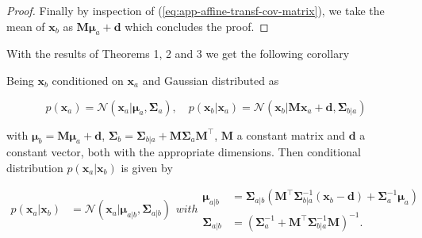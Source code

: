 \begin{appendices}
\begin{proof}
    Finally by inspection of (\ref{eq:app-affine-transf-cov-matrix}), we take the mean of $\mathbf{x}_b$ as $\mathbf{M} \boldsymbol{\mu}_{a}+\mathbf{d}$ which concludes the proof.
  \end{proof}

  With the results of Theorems 1, 2 and 3 we get the following corollary

  \begin{corollary}
    \label{cor:aff-marg-cond-gaussian}

    Being $\mathbf{x}_b$ conditioned on $\mathbf{x}_a$ and Gaussian distributed as

    \begin{equation}
      p\left(\mathbf{x}_{a}\right)=\mathcal{N}\left(\mathbf{x}_{a} | \boldsymbol{\mu}_{a}, \boldsymbol{\Sigma}_{a}\right), \quad p\left(\mathbf{x}_{b} | \mathbf{x}_{a}\right)=\mathcal{N}\left(\mathbf{x}_{b} | \mathbf{M} \mathbf{x}_{a}+\mathbf{d}, \boldsymbol{\Sigma}_{b | a}\right)
    \end{equation}

    with $\boldsymbol{\mu}_{b} =\mathbf{M} \boldsymbol{\mu}_{a}+\mathbf{d}$, $\boldsymbol{\Sigma}_{b} =\boldsymbol{\Sigma}_{b | a}+\mathbf{M} \boldsymbol{\Sigma}_{a} \mathbf{M}^\top$, $\mathbf{M}$ a constant matrix and $\mathbf{d}$ a constant vector, both with the appropriate dimensions. Then conditional distribution $p(\mathbf{x}_a|\mathbf{x}_b)$ is given by

    \begin{subequations}
    
    \begin{align}
      p\left(\mathbf{x}_{a} | \mathbf{x}_{b}\right)&=\mathcal{N}\left(\mathbf{x}_{a} | \boldsymbol{\mu}_{a | b}, \boldsymbol{\Sigma}_{a | b}\right)
    \end{align}
    with
    \begin{align}
        \boldsymbol{\mu}_{a | b}&=\boldsymbol{\Sigma}_{a | b}\left(\mathbf{M}^\top \boldsymbol{\Sigma}_{b | a}^{-1}\left(\mathbf{x}_{b}-\mathbf{d}\right)+\boldsymbol{\Sigma}_{a}^{-1} \boldsymbol{\mu}_{a}\right) \\ \boldsymbol{\Sigma}_{a | b}&=\left(\boldsymbol{\Sigma}_{a}^{-1}+\mathbf{M}^\top \boldsymbol{\Sigma}_{b | a}^{-1} \mathbf{M}\right)^{-1}.
    \end{align}
  \end{subequations}
  \end{corollary}

\end{appendices}